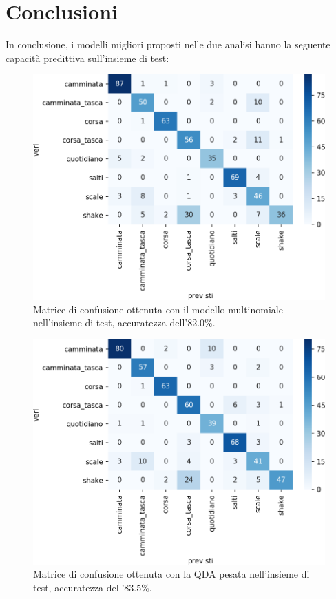 \documentclass[main.tex]{subfiles}
\begin{document}
\section{Conclusioni}
In conclusione, i modelli migliori proposti nelle due analisi hanno la seguente capacità predittiva sull'insieme di test:
\begin{figure}[H]
	\centering
	\includegraphics[width=.5\textwidth]{../../figure/confusionMatrix-Mn-test.png}
	\caption{Matrice di confusione ottenuta con il modello multinomiale nell'insieme di test, accuratezza dell'82.0\%.}
	\label{fig:mn}
\end{figure}

\begin{figure}[H]
	\centering
	\includegraphics[width=.5\textwidth]{../../figure/confusionMatrix-QDA-penalizzata-test.png}
	\caption{Matrice di confusione ottenuta con la QDA pesata nell'insieme di test, accuratezza dell'83.5\%.}
	\label{fig:mn}
\end{figure}
\end{document}
